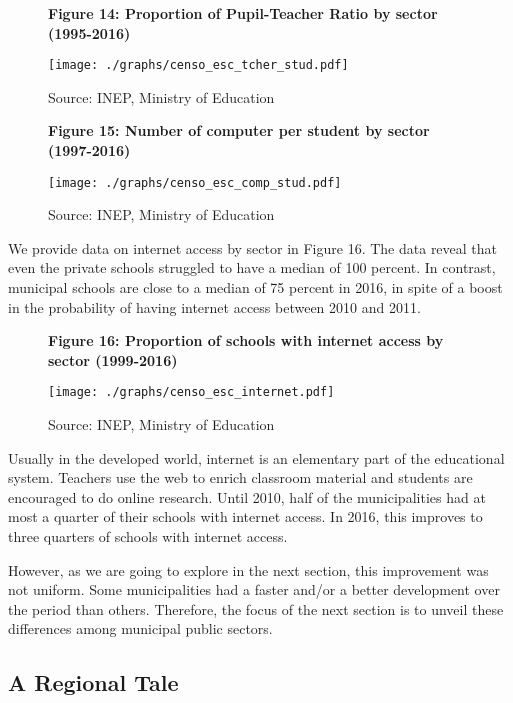 \documentclass[12pt,]{book}
\begin{document}
\begin{figure}
    \centering
    \textbf{\small Figure 14: Proportion of Pupil-Teacher Ratio by sector (1995-2016)}\par\medskip
    \texttt{[image: ./graphs/censo\_esc\_tcher\_stud.pdf]}
    \caption*{\footnotesize \hfill Source: INEP, Ministry of Education}
\end{figure}

\begin{figure}
    \centering
    \textbf{\small Figure 15: Number of computer per student by sector (1997-2016)}\par\medskip
    \texttt{[image: ./graphs/censo\_esc\_comp\_stud.pdf]}
    \caption*{\footnotesize \hfill Source: INEP, Ministry of Education}
\end{figure}

We provide data on internet access by sector in Figure 16. The data reveal that even the private schools struggled to have a median of 100 percent. In contrast, municipal schools are close to a median of 75 percent in 2016, in spite of a boost in the probability of having internet access between 2010 and 2011.

\begin{figure}
    \centering
    \textbf{\small Figure 16: Proportion of schools with internet access by sector (1999-2016)}\par\medskip
    \texttt{[image: ./graphs/censo\_esc\_internet.pdf]}
    \caption*{\footnotesize \hfill Source: INEP, Ministry of Education}
\end{figure}

Usually in the developed world, internet is an elementary part of the educational system. Teachers use the web to enrich classroom material and students are encouraged to do online research. Until 2010, half of the municipalities had at most a quarter of their schools with internet access. In 2016, this improves to three quarters of schools with internet access.

However, as we are going to explore in the next section, this improvement was not uniform. Some municipalities had a faster and/or a better development over the period than others. Therefore, the focus of the next section is to unveil these differences among municipal public sectors.

\subsection{A Regional Tale}
\end{document}
